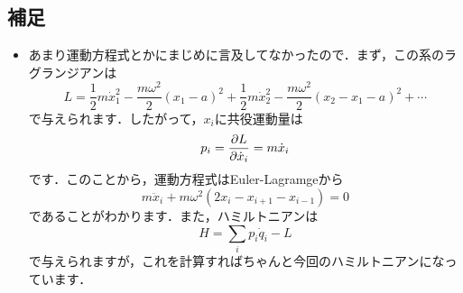 \documentclass[a4paper,pdflatex,ja=standard]{bxjsarticle}
\begin{document}
\subsection*{補足}
\begin{itemize}
  \item 
  あまり運動方程式とかにまじめに言及してなかったので．まず，この系のラグランジアンは
  \begin{equation}
    L
    =
    \frac{1}{2}m\dot{x}_1^2
    -
    \frac{m\omega^2}{2}
    (x_1-a)^2
    +
    \frac{1}{2}m\dot{x}_2^2
    -
    \frac{m\omega^2}{2}
    (x_2-x_1-a)^2
    +
    \cdots
  \end{equation}
  で与えられます．したがって，$x_i$に共役運動量は
  \begin{equation}
    p_i
    =
    \pdv{L}{\dot{x}_i}
    =
    m\dot{x}_i
  \end{equation}
  です．このことから，運動方程式はEuler-Lagramgeから
  \begin{equation}
    m\ddot{x}_i
    +
    m\omega^2
    (2x_i-x_{i+1}-x_{i-1})
    =
    0
  \end{equation}
  であることがわかります．また，ハミルトニアンは
  \begin{equation}
    H
    =
    \sum_{i}p_i\dot{q}_i
    -
    L
  \end{equation}
  で与えられますが，これを計算すればちゃんと今回のハミルトニアンになっています．

\end{itemize}
\end{document}
